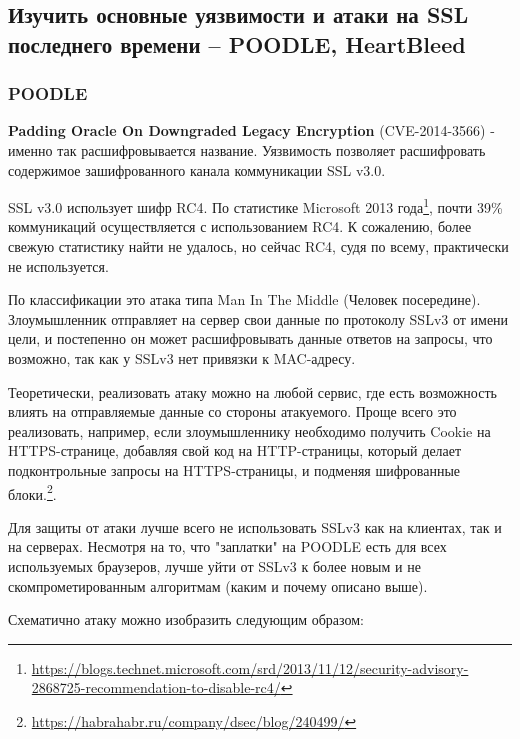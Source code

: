 \documentclass[a4paper]{article}
\begin{document}
\subsection{Изучить основные уязвимости и атаки на SSL последнего времени – POODLE, HeartBleed}

\subsubsection{POODLE}

\textbf{Padding Oracle On Downgraded Legacy Encryption} (CVE-2014-3566) - именно так расшифровывается название. Уязвимость позволяет расшифровать содержимое зашифрованного канала коммуникации SSL v3.0. 

SSL v3.0 использует шифр RC4. По статистике Microsoft 2013 года\footnote{\url{https://blogs.technet.microsoft.com/srd/2013/11/12/security-advisory-2868725-recommendation-to-disable-rc4/}}, почти 39\% коммуникаций осуществляется с использованием RC4. К сожалению, более свежую статистику найти не удалось, но сейчас RC4, судя по всему, практически не используется.

По классификации это атака типа Man In The Middle (Человек посередине). Злоумышленник отправляет на сервер свои данные по протоколу SSLv3 от имени цели, и постепенно он может расшифровывать данные ответов на запросы, что возможно, так как у SSLv3 нет привязки к MAC-адресу. 

Теоретически, реализовать атаку можно на любой сервис, где есть возможность влиять на отправляемые данные со стороны атакуемого. Проще всего это реализовать, например, если злоумышленнику необходимо получить Cookie на HTTPS-странице, добавляя свой код на HTTP-страницы, который делает подконтрольные запросы на HTTPS-страницы, и подменяя шифрованные блоки.\footnote{\url{https://habrahabr.ru/company/dsec/blog/240499/}}.

Для защиты от атаки лучше всего не использовать SSLv3 как на клиентах, так и на серверах. Несмотря на то, что "заплатки" на POODLE есть для всех используемых браузеров, лучше уйти от SSLv3 к более новым и не скомпрометированным алгоритмам (каким и почему описано выше).

Схематично атаку можно изобразить следующим образом:
\end{document}
